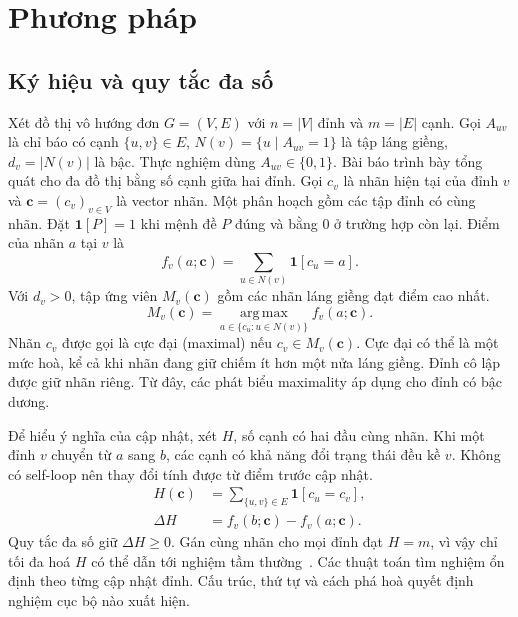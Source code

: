 \section{Phương pháp}
\label{sec:methods}

\subsection{Ký hiệu và quy tắc đa số}

Xét đồ thị vô hướng đơn $G=(V,E)$ với $n=|V|$ đỉnh và $m=|E|$ cạnh. Gọi $A_{uv}$ là chỉ báo có cạnh $\{u,v\}\in E$, $N(v)=\{u\mid A_{uv}=1\}$ là tập láng giềng, $d_v=|N(v)|$ là bậc. Thực nghiệm dùng $A_{uv}\in\{0,1\}$. Bài báo trình bày tổng quát cho đa đồ thị bằng số cạnh giữa hai đỉnh. Gọi $c_v$ là nhãn hiện tại của đỉnh $v$ và $\mathbf{c}=(c_v)_{v\in V}$ là vector nhãn. Một phân hoạch gồm các tập đỉnh có cùng nhãn. Đặt $\mathbf{1}[P]=1$ khi mệnh đề $P$ đúng và bằng 0 ở trường hợp còn lại. Điểm của nhãn $a$ tại $v$ là
\begin{equation}
  f_v(a;\mathbf{c})=\sum_{u\in N(v)}\mathbf{1}[c_u=a].
  \label{eq:vote}
\end{equation}
Với $d_v>0$, tập ứng viên $M_v(\mathbf{c})$ gồm các nhãn láng giềng đạt điểm cao nhất.
\begin{equation}
 M_v(\mathbf{c})=\operatorname*{arg\,max}_{a\in \{c_u:u\in N(v)\}} f_v(a;\mathbf{c}).
 \label{eq:maximal}
\end{equation}
Nhãn $c_v$ được gọi là cực đại (maximal) nếu $c_v\in M_v(\mathbf{c})$. Cực đại có thể là một mức hoà, kể cả khi nhãn đang giữ chiếm ít hơn một nửa láng giềng. Đỉnh cô lập được giữ nhãn riêng. Từ đây, các phát biểu maximality áp dụng cho đỉnh có bậc dương.

Để hiểu ý nghĩa của cập nhật, xét $H$, số cạnh có hai đầu cùng nhãn. Khi một đỉnh $v$ chuyển từ $a$ sang $b$, các cạnh có khả năng đổi trạng thái đều kề $v$. Không có self-loop nên thay đổi tính được từ điểm trước cập nhật.
\begin{equation}
 \begin{split}
 H(\mathbf{c}) &= \sum_{\{u,v\}\in E}\mathbf{1}[c_u=c_v],\\
 \Delta H &= f_v(b;\mathbf{c})-f_v(a;\mathbf{c}).
 \end{split}
 \label{eq:potential}
\end{equation}
Quy tắc đa số giữ $\Delta H\ge0$. Gán cùng nhãn cho mọi đỉnh đạt $H=m$, vì vậy chỉ tối đa hoá $H$ có thể dẫn tới nghiệm tầm thường~\cite{tibely}. Các thuật toán tìm nghiệm ổn định theo từng cập nhật đỉnh. Cấu trúc, thứ tự và cách phá hoà quyết định nghiệm cục bộ nào xuất hiện.

